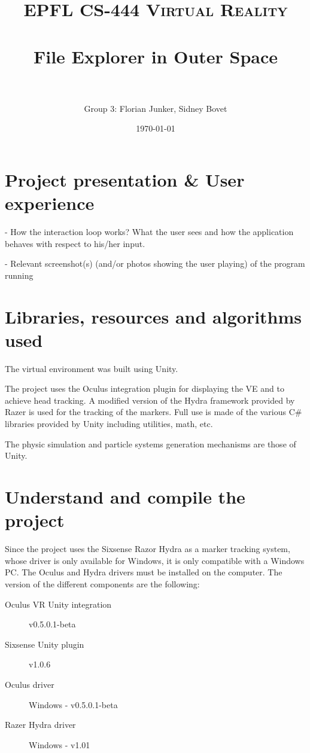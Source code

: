 \documentclass[paper=a4, fontsize=11pt]{scrartcl} %
\title{
	\normalfont \normalsize
	\textsc{EPFL CS-444 Virtual Reality} \\ [25pt] %
	\horrule{0.5pt} \\[0.4cm] %
	\huge File Explorer in Outer Space \\ %
	\horrule{2pt} \\[0.5cm] %
}
\author{Group 3: Florian Junker, Sidney Bovet} %
\date{\normalsize\today} %
\numberwithin{equation}{section} %
\numberwithin{figure}{section} %
\numberwithin{table}{section} %
\begin{document}
\maketitle %




\section{Project presentation \& User experience}
- How the interaction loop works? What the user sees and how the application behaves with respect to his/her input.

- Relevant screenshot(s) (and/or photos showing the user playing) of the program running


\section{Libraries, resources and algorithms used}
The virtual environment was built using Unity.

The project uses the Oculus integration plugin for displaying the VE and to achieve head tracking. A modified version of the Hydra framework provided by Razer is used for the tracking of the markers. Full use is made of the various C\# libraries provided by Unity including utilities, math, etc.

The physic simulation and particle systems generation mechanisms are those of Unity.

	
	\section{Understand and compile the project}
	Since the project uses the Sixsense Razor Hydra as a marker tracking system, whose driver is only available for Windows, it is only compatible with a Windows PC. The Oculus and Hydra drivers must be installed on the computer. The version of the different components are the following:
	\begin{description}
		\item[Oculus VR Unity integration] v0.5.0.1-beta
		\item[Sixsense Unity plugin] v1.0.6
		\item[Oculus driver] Windows - v0.5.0.1-beta
		\item[Razer Hydra driver] Windows - v1.01
	\end{description}
	
\end{document}
